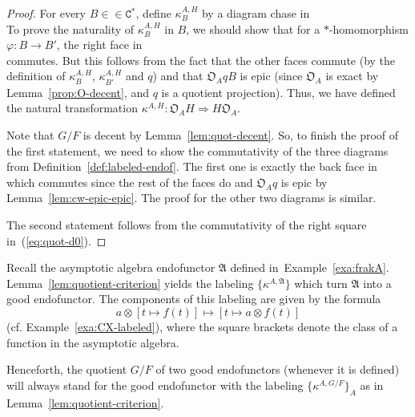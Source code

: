 \documentclass[10pt]{simplearticle}
\newcommand{\tikzinput}[1]{}
\newcommand{\Cstar}{\mathtt{C^{*}}}
\begin{document}
\begin{proof}
For every $B\in\in\Cstar$, define $\kappa^{A,H}_{B}$ by a diagram
chase in
\begin{equation}
\tikzinput{d260}\label{eq:quot-d0}
\end{equation}
To prove the naturality of $\kappa^{A,H}_{B}$ in $B$, we should
show that for a $*$-homomorphism $\varphi\colon B\to B'$, the right
face in
\begin{equation}
\tikzinput{d261}\label{eq:d261}
\end{equation}
commutes. But this follows from the fact that the other faces commute
(by the definition of $\kappa^{A,H}_{B}$, $\kappa^{A,H}_{B'}$ and
$q$) and that $\mathfrak{O}_{A}qB$ is epic (since $\mathfrak{O}_{A}$
is exact by Lemma~\ref{prop:O-decent}, and $q$ is a quotient projection).
Thus, we have defined the natural transformation $\kappa^{A,H}\colon\mathfrak{O}_{A}H\Rightarrow H\mathfrak{O}_{A}$.

Note that $G/F$ is decent by Lemma~\ref{lem:quot-decent}. So, to
finish the proof of the first statement, we need to show the commutativity
of the three diagrams from Definition~\ref{def:labeled-endof}. The
first one is exactly the back face in
\[
\tikzinput{d262}
\]
which commutes since the rest of the faces do and $\mathfrak{O}_{A}q$
is epic by Lemma~\ref{lem:cw-epic-epic}. The proof for the other
two diagrams is similar.

The second statement follows from the commutativity of the right square
in~(\ref{eq:quot-d0}).
\end{proof}

\begin{example}\label{exa:frakA-labeling}
Recall
the asymptotic
algebra endofunctor $\mathfrak{A}$ defined in~Example~\ref{exa:frakA}.
Lemma~\ref{lem:quotient-criterion} yields the labeling $\{\kappa^{A,\mathfrak{A}}\}$
which turn $\mathfrak{A}$ into a good endofunctor. The components
of this labeling are given by the formula
\[
a\otimes[t\mapsto f(t)]\mapsto[t\mapsto a\otimes f(t)]
\]
 (cf. Example~\ref{exa:CX-labeled}), where the square brackets denote
the class of a function in the asymptotic algebra.
\end{example}

\begin{rem}
Henceforth, the quotient $G/F$ of two good endofunctors (whenever
it is defined) will always stand for the good endofunctor with the
labeling $\{\kappa^{A,G/F}\}_{A}$ as in Lemma~\ref{lem:quotient-criterion}.
\end{rem}
\end{document}
